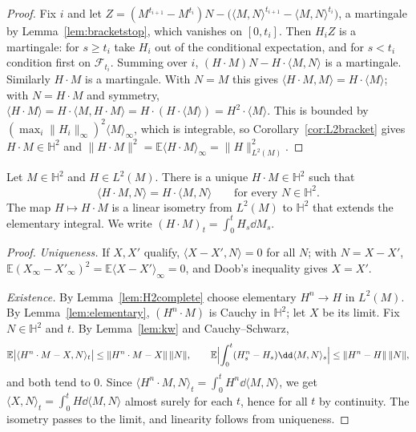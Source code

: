 \begin{proof}
Fix $i$ and let $Z=(M^{t_{i+1}}-M^{t_i})N-\bigl(\langle M,N\rangle^{t_{i+1}}-\langle M,N\rangle^{t_i}\bigr)$, a martingale by Lemma~\ref{lem:bracketstop}, which vanishes on $[0,t_i]$. Then $H_iZ$ is a martingale: for
$s\ge t_i$ take $H_i$ out of the conditional expectation, and for $s<t_i$ condition first on $\mathcal F_{t_i}$. Summing over $i$, $(H\cdot M)N-H\cdot\langle M,N\rangle$ is a martingale. Similarly $H\cdot M$ is a
martingale. With $N=M$ this gives $\langle H\cdot M,M\rangle=H\cdot\langle M\rangle$; with $N=H\cdot M$ and symmetry, $\langle H\cdot M\rangle=H\cdot\langle M,H\cdot M\rangle=H\cdot(H\cdot\langle M\rangle)=H^2\cdot\langle M\rangle$.
This is bounded by $(\max_i\|H_i\|_\infty)^2\langle M\rangle_\infty$, which is integrable, so Corollary~\ref{cor:L2bracket} gives $H\cdot M\in\mathbb H^2$ and $\|H\cdot M\|^2=\mathbb E\langle H\cdot M\rangle_\infty=\|H\|^2_{L^2(M)}$.
\end{proof}

\begin{theorem}\label{thm:itoH2}
Let $M\in\mathbb H^2$ and $H\in L^2(M)$. There is a unique $H\cdot M\in\mathbb H^2$ such that
\[
\langle H\cdot M,N\rangle=H\cdot\langle M,N\rangle\qquad\text{for every }N\in\mathbb H^2 .
\]
The map $H\mapsto H\cdot M$ is a linear isometry from $L^2(M)$ to $\mathbb H^2$ that extends the elementary integral. We write $(H\cdot M)_t=\int_0^tH_s\dd M_s$.
\end{theorem}

\begin{proof}
\emph{Uniqueness.} If $X,X'$ qualify, $\langle X-X',N\rangle=0$ for all $N$; with $N=X-X'$, $\mathbb E(X_\infty-X'_\infty)^2=\mathbb E\langle X-X'\rangle_\infty=0$, and Doob's inequality gives $X=X'$.

\emph{Existence.} By Lemma~\ref{lem:H2complete} choose elementary $H^n\to H$ in $L^2(M)$. By Lemma~\ref{lem:elementary}, $(H^n\cdot M)$ is Cauchy in $\mathbb H^2$; let $X$ be its limit. Fix $N\in\mathbb H^2$ and $t$. By
Lemma~\ref{lem:kw} and Cauchy--Schwarz,
\[
\mathbb E\bigl|\langle H^n\cdot M-X,N\rangle_t\bigr|\le\|H^n\cdot M-X\|\,\|N\|,\qquad\mathbb E\Bigl|\int_0^t(H^n_s-H_s)\dd\langle M,N\rangle_s\Bigr|\le\|H^n-H\|\,\|N\|,
\]
and both tend to $0$. Since $\langle H^n\cdot M,N\rangle_t=\int_0^tH^n\dd\langle M,N\rangle$, we get $\langle X,N\rangle_t=\int_0^tH\dd\langle M,N\rangle$ almost surely for each $t$, hence for all $t$ by continuity. The
isometry passes to the limit, and linearity follows from uniqueness.
\end{proof}

